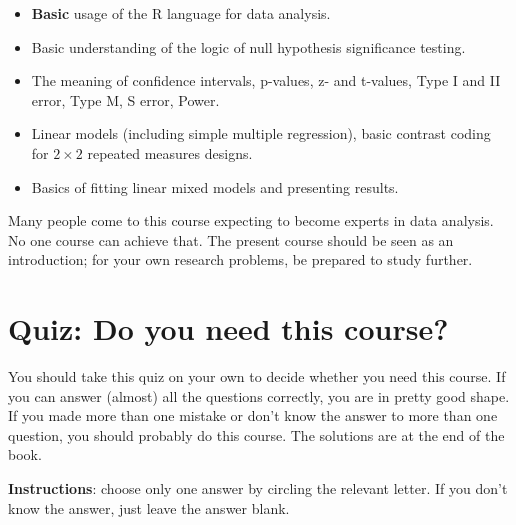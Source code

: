 \documentclass[12pt]{book}
\begin{document}
\begin{itemize}
\item \textbf{Basic} usage of the R language for data analysis.
\item Basic understanding of the logic of null hypothesis significance testing.
\item The meaning of confidence intervals, p-values, z- and t-values, Type I and II error, Type M, S error, Power. 
\item Linear models (including simple multiple regression), basic contrast coding for $2\times 2$ repeated measures designs.
\item Basics of fitting linear mixed models and presenting results.
\end{itemize}

Many people come to this course expecting to become experts in data analysis. No one course can achieve that. The present course should be seen as an introduction; for your own research problems, be prepared to study further.

\section{Quiz: Do you need this course?}

You should take this quiz on your own to decide whether you need this course. If you can answer (almost) all the questions correctly, you are in pretty good shape. If you made more than one mistake or don't know the answer to more than one question, you should probably do this course. The solutions are at the end of the book.

\textbf{Instructions}: choose only one answer by circling the relevant letter. If you don't know the answer, just leave the answer blank. 
\end{document}

